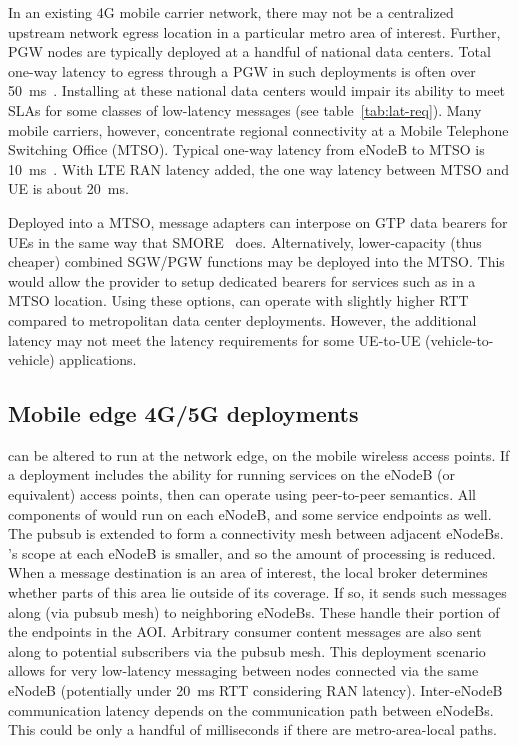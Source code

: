 In an existing 4G mobile carrier network, there may not be a
centralized upstream network egress location in a particular metro
area of interest. Further, PGW nodes are typically deployed at a
handful of national data centers.  Total one-way latency to egress
through a PGW in such deployments is often over
50~ms~\cite[Chapter~7]{grigorik2013high}. Installing \name{} at these national
data centers would impair its ability to meet SLAs for some classes of
low-latency messages (see table~\ref{tab:lat-req}). Many mobile
carriers, however, concentrate regional connectivity at a Mobile
Telephone Switching Office (MTSO).  Typical one-way latency from
eNodeB to MTSO is 10~ms~\cite{cho2014smore}. With LTE RAN latency
added, the one way latency between MTSO and UE is about 20~ms.

Deployed into a MTSO, \name{} message adapters can interpose on GTP
data bearers for UEs in the same way that SMORE~\cite{cho2014smore}
does. Alternatively, lower-capacity (thus cheaper) combined SGW/PGW
functions may be deployed into the MTSO. This would allow the provider
to setup dedicated bearers for services such as \name{} in a MTSO
location.  Using these options, \name{} can operate with slightly
higher RTT compared to metropolitan data center deployments.  However,
the additional latency may not meet the latency requirements for some
UE-to-UE (vehicle-to-vehicle) applications.

\subsection{Mobile edge 4G/5G deployments}

\name{} can be altered to run at the network edge, on the mobile
wireless access points.  If a deployment includes the ability for
running services on the eNodeB (or equivalent) access points, then
\name{} can operate using peer-to-peer semantics.  All components of
\name{} would run on each eNodeB, and some service endpoints as
well. The pubsub is extended to form a connectivity mesh between
adjacent eNodeBs. \name's scope at each eNodeB is smaller, and so
the amount of processing is reduced. When a message destination is an
area of interest, the local \name{} broker determines whether parts of
this area lie outside of its coverage.  If so, it sends such messages
along (via pubsub mesh) to neighboring eNodeBs. These handle their
portion of the endpoints in the AOI.  Arbitrary consumer content
messages are also sent along to potential subscribers via the pubsub
mesh.  This deployment scenario allows for very low-latency messaging
between nodes connected via the same eNodeB (potentially under 20~ms
RTT considering RAN latency). Inter-eNodeB communication latency
depends on the communication path between eNodeBs.  This could be only
a handful of milliseconds if there are metro-area-local paths.

